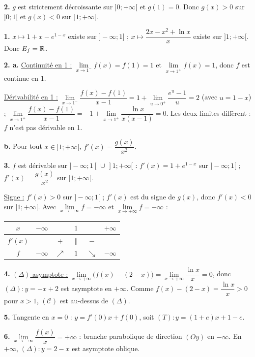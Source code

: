 \documentclass[11pt]{article}
\begin{document}
\textbf{2.} $g$ est strictement décroissante sur $]0;+\infty[$ et $g(1) = 0$. Donc $g(x) > 0$ sur $]0;1[$ et $g(x) < 0$ sur $]1;+\infty[$.

\textbf{1.} $x \mapsto 1 + x - e^{1-x}$ existe sur $]-\infty;1]$ ; $x \mapsto \dfrac{2x - x^2 + \ln x}{x}$ existe sur $]1;+\infty[$. Donc $E_f = \mathbb{R}$.

\textbf{2. a.} \underline{Continuité en 1 :} $\lim\limits_{x\to 1^-} f(x) = f(1) = 1$ et $\lim\limits_{x\to 1^+} f(x) = 1$, donc $f$ est continue en 1.

\underline{Dérivabilité en 1 :} $\lim\limits_{x\to 1^-}\dfrac{f(x) - f(1)}{x - 1} = 1 + \lim\limits_{u\to 0^+}\dfrac{e^u - 1}{u} = 2$ (avec $u = 1 - x$) ; $\lim\limits_{x\to 1^+}\dfrac{f(x) - f(1)}{x - 1} = -1 + \lim\limits_{x\to 1^+}\dfrac{\ln x}{x(x-1)} = 0$. Les deux limites diffèrent : $f$ n'est pas dérivable en 1.

\textbf{b.} Pour tout $x \in ]1;+\infty[$, $f'(x) = \dfrac{g(x)}{x^2}$.

\textbf{3.} $f$ est dérivable sur $]-\infty;1[\,\cup\,]1;+\infty[$ : $f'(x) = 1 + e^{1-x}$ sur $]-\infty;1[$ ; $f'(x) = \dfrac{g(x)}{x^2}$ sur $]1;+\infty[$.

\underline{Signe :} $f'(x) > 0$ sur $]-\infty;1[$ ; $f'(x)$ est du signe de $g(x)$, donc $f'(x) < 0$ sur $]1;+\infty[$. Avec $\lim\limits_{x\to-\infty} f = -\infty$ et $\lim\limits_{x\to+\infty} f = -\infty$ :
\begin{center}\renewcommand{\arraystretch}{1.4}
\begin{tabular}{|c|ccccc|}
\hline $x$ & $-\infty$ & & $1$ & & $+\infty$ \\\hline $f'(x)$ & & $+$ & $\|$ & $-$ & \\\hline $f$ & $-\infty$ & $\nearrow$ & $1$ & $\searrow$ & $-\infty$ \\\hline
\end{tabular}
\end{center}

\textbf{4.} \underline{$(\Delta)$ asymptote :} $\lim\limits_{x\to+\infty}\big(f(x) - (2 - x)\big) = \lim\limits_{x\to+\infty}\dfrac{\ln x}{x} = 0$, donc $(\Delta) : y = -x + 2$ est asymptote en $+\infty$. Comme $f(x) - (2-x) = \dfrac{\ln x}{x} > 0$ pour $x > 1$, $(\mathcal{C})$ est au-dessus de $(\Delta)$.

\textbf{5.} Tangente en $x = 0$ : $y = f'(0)x + f(0)$, soit $(T) : y = (1 + e)x + 1 - e$.

\textbf{6.} $\lim\limits_{x\to-\infty}\dfrac{f(x)}{x} = +\infty$ : branche parabolique de direction $(Oy)$ en $-\infty$. En $+\infty$, $(\Delta) : y = 2 - x$ est asymptote oblique.
\end{document}
